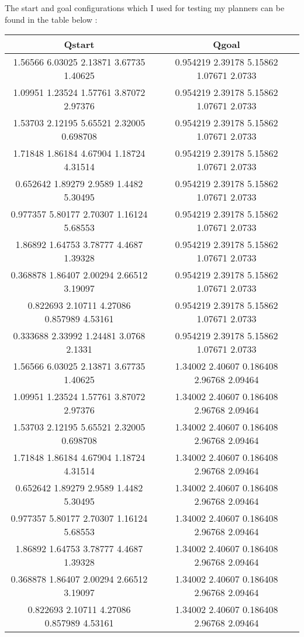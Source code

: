 \documentclass[12pt]{article}
\begin{document}
The start and goal configurations which I used for testing my planners can be found in the table below :
\begin{table}[h]
\centering
\begin{tabular}{|c|c|}
\hline
\textbf{Qstart}                                    & \textbf{Qgoal}                               \\ \hline
1.56566 6.03025 2.13871 3.67735 1.40625   & 0.954219 2.39178 5.15862 1.07671 2.0733  \\ \hline
1.09951 1.23524 1.57761 3.87072 2.97376   & 0.954219 2.39178 5.15862 1.07671 2.0733  \\ \hline
1.53703 2.12195 5.65521 2.32005 0.698708  & 0.954219 2.39178 5.15862 1.07671 2.0733  \\ \hline
1.71848 1.86184 4.67904 1.18724 4.31514   & 0.954219 2.39178 5.15862 1.07671 2.0733  \\ \hline
0.652642 1.89279 2.9589 1.4482 5.30495    & 0.954219 2.39178 5.15862 1.07671 2.0733  \\ \hline
0.977357 5.80177 2.70307 1.16124 5.68553  & 0.954219 2.39178 5.15862 1.07671 2.0733  \\ \hline
1.86892 1.64753 3.78777 4.4687 1.39328    & 0.954219 2.39178 5.15862 1.07671 2.0733  \\ \hline
0.368878 1.86407 2.00294 2.66512 3.19097  & 0.954219 2.39178 5.15862 1.07671 2.0733  \\ \hline
0.822693 2.10711 4.27086 0.857989 4.53161 & 0.954219 2.39178 5.15862 1.07671 2.0733  \\ \hline
0.333688 2.33992 1.24481 3.0768 2.1331    & 0.954219 2.39178 5.15862 1.07671 2.0733  \\ \hline
1.56566 6.03025 2.13871 3.67735 1.40625   & 1.34002 2.40607 0.186408 2.96768 2.09464 \\ \hline
1.09951 1.23524 1.57761 3.87072 2.97376   & 1.34002 2.40607 0.186408 2.96768 2.09464 \\ \hline
1.53703 2.12195 5.65521 2.32005 0.698708  & 1.34002 2.40607 0.186408 2.96768 2.09464 \\ \hline
1.71848 1.86184 4.67904 1.18724 4.31514   & 1.34002 2.40607 0.186408 2.96768 2.09464 \\ \hline
0.652642 1.89279 2.9589 1.4482 5.30495    & 1.34002 2.40607 0.186408 2.96768 2.09464 \\ \hline
0.977357 5.80177 2.70307 1.16124 5.68553  & 1.34002 2.40607 0.186408 2.96768 2.09464 \\ \hline
1.86892 1.64753 3.78777 4.4687 1.39328    & 1.34002 2.40607 0.186408 2.96768 2.09464 \\ \hline
0.368878 1.86407 2.00294 2.66512 3.19097  & 1.34002 2.40607 0.186408 2.96768 2.09464 \\ \hline
0.822693 2.10711 4.27086 0.857989 4.53161 & 1.34002 2.40607 0.186408 2.96768 2.09464 \\ \hline
\end{tabular}
\end{table}
\end{document}
